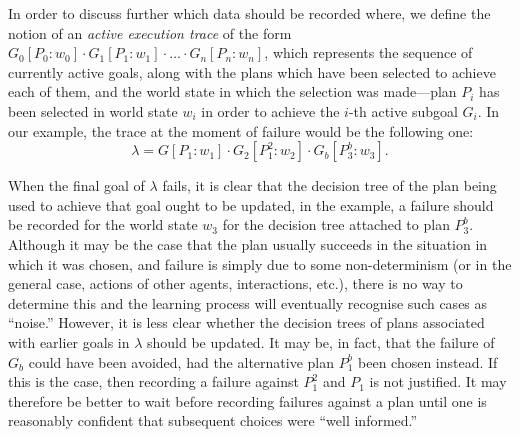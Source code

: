 

In order to discuss further which data should be recorded where, we
define the notion of an \textit{active execution trace} of the form
$G_0[P_0:w_0] \cdot G_1[P_1:w_1] \cdot \ldots \cdot G_n[P_n:w_n]$, which
represents the sequence of currently active goals, along with the plans which 
have been selected to achieve each of them, and the world state in which the selection 
was made---plan $P_i$ has been selected in world state $w_i$ in order to achieve the $i$-th
active subgoal $G_i$.
%
In our example, the trace at the moment of failure would be the following one:
\[
\lambda=G[P_1:w_1] \cdot G_2[P_1^2:w_2] \cdot G_b[P_3^b:w_3].
\]

When the final goal of $\lambda$ fails, it is clear that the decision
tree of the plan being used to achieve that goal ought to be updated, in
the example, a failure should be recorded for the world state $w_3$
for the decision tree attached to plan $P_3^b$.  Although it may be the case
that the plan usually succeeds in the situation in which it was
chosen, and failure is simply due to some non-determinism (or in the
general case, actions of other agents, interactions, etc.), there is
no way to determine this and the learning process will eventually
recognise such cases as ``noise.'' However, it is less clear whether
the decision trees of plans associated with earlier goals in $\lambda$
should be updated.  It may be, in fact, that the failure of $G_b$ could
have been avoided, had the alternative plan $P_1^b$ been chosen instead.
If this is the case, then recording a failure against $P_1^2$ and $P_1$ is not
justified.  It may therefore be better to wait before recording failures
against a plan until one is reasonably confident that subsequent choices were ``well informed.''

